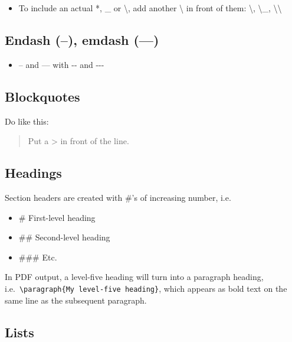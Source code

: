 \documentclass[a4paper, twoside]{templates/ociamthesis}
\providecommand{\tightlist}{%
  \setlength{\itemsep}{0pt}\setlength{\parskip}{0pt}}
\begin{document}
\begin{itemize}
\tightlist
\item
  To include an actual *, \_ or \textbackslash, add another \textbackslash{} in front of them: \textbackslash*, \textbackslash\_, \textbackslash\textbackslash{}
\end{itemize}

\hypertarget{endash-emdash}{%
\subsection{Endash (--), emdash (---)}\label{endash-emdash}}

\begin{itemize}
\tightlist
\item
  -- and --- with -\/- and -\/-\/-
\end{itemize}

\hypertarget{blockquotes}{%
\subsection{Blockquotes}\label{blockquotes}}

Do like this:

\begin{quote}
Put a \textgreater{} in front of the line.
\end{quote}

\hypertarget{headings}{%
\subsection{Headings}\label{headings}}

Section headers are created with \#'s of increasing number, i.e.~

\begin{itemize}
\tightlist
\item
  \# First-level heading
\item
  \#\# Second-level heading
\item
  \#\#\# Etc.
\end{itemize}

In PDF output, a level-five heading will turn into a paragraph heading, i.e.~\texttt{\textbackslash{}paragraph\{My\ level-five\ heading\}}, which appears as bold text on the same line as the subsequent paragraph.

\hypertarget{lists}{%
\subsection{Lists}\label{lists}}
\end{document}
